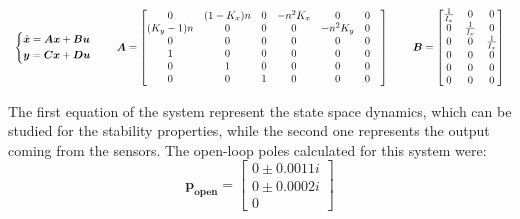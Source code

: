 \begin{equation}
    \begin{tabular}{c c c c c}
        $\begin{dcases}
            \dot{\boldsymbol{x}} = \boldsymbol{Ax} + \boldsymbol{Bu} \\
            \boldsymbol{y}       = \boldsymbol{Cx} + \boldsymbol{Du} \\
        \end{dcases}$
        & &
        $\boldsymbol{A} =
        \begin{bmatrix}
            0 & (1-K_x)n & 0 & -n^2K_x & 0 & 0 & \\   
            (K_y-1)n & 0 & 0 & 0 & -n^2K_y & 0 & \\   
            0 & 0 & 0 & 0 & 0 & 0 & \\   
            1 & 0 & 0 & 0 & 0 & 0 & \\   
            0 & 1 & 0 & 0 & 0 & 0 & \\   
            0 & 0 & 1 & 0 & 0 & 0 &
        \end{bmatrix}$
        & &
        $\boldsymbol{B}=
        \begin{bmatrix}
            \frac{1}{I_x} & 0 & 0 \\
            0 & \frac{1}{I_x} & 0 \\
            0 & 0 & \frac{1}{I_x} \\
            0 & 0 & 0 \\   
            0 & 0 & 0 \\
            0 & 0 & 0
        \end{bmatrix}$
    \end{tabular}
\end{equation}

The first equation of the system represent the state space dynamics, which can be studied for the stability properties, while the second one represents the output coming from the sensors. The open-loop poles calculated for this system were:
\begin{equation}
    \boldsymbol{p_{open}} =
    \begin{bmatrix}
        0 \pm 0.0011i \\   
        0 \pm 0.0002i \\   
        0
    \end{bmatrix}
\end{equation}


